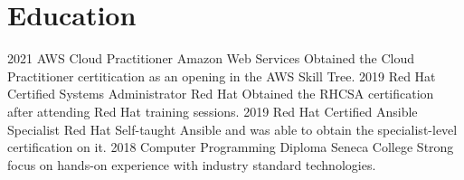 \documentclass[]{friggeri-cv}
\begin{document}
\section{Education}
\begin{entrylist}
  \entry
    {2021}
    {AWS Cloud Practitioner}
    {Amazon Web Services}
    {Obtained the Cloud Practitioner certitication as an opening in the AWS Skill Tree.}
  \entry
    {2019}
    {Red Hat Certified Systems Administrator}
    {Red Hat}
    {Obtained the RHCSA certification after attending Red Hat training sessions.}
  \entry
    {2019}
    {Red Hat Certified Ansible Specialist}
    {Red Hat}
    {Self-taught Ansible and was able to obtain the specialist-level certification on it.}
  \entry
    {2018}
    {Computer Programming Diploma}
    {Seneca College}
    {Strong focus on hands-on experience with industry standard technologies.}
\end{entrylist}
\end{document}
